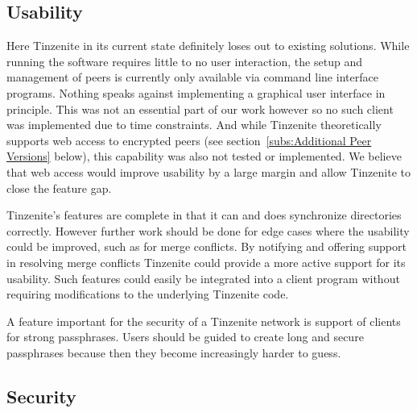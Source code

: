 %

\subsection{Usability}
\label{sub:Usability}

Here Tinzenite in its current state definitely loses out to existing solutions.
While running the software requires little to no user interaction, the setup and management of peers is currently only available via command line interface programs.
Nothing speaks against implementing a graphical user interface in principle.
This was not an essential part of our work however so no such client was implemented due to time constraints.
And while Tinzenite theoretically supports web access to encrypted peers (see section~\ref{subs:Additional Peer Versions} below), this capability was also not tested or implemented.
We believe that web access would improve usability by a large margin and allow Tinzenite to close the feature gap.

Tinzenite's features are complete in that it can and does synchronize directories correctly.
However further work should be done for edge cases where the usability could be improved, such as for merge conflicts.
By notifying and offering support in resolving merge conflicts Tinzenite could provide a more active support for its usability.
Such features could easily be integrated into a client program without requiring modifications to the underlying Tinzenite code.

A feature important for the security of a Tinzenite network is support of clients for strong passphrases.
Users should be guided to create long and secure passphrases because then they become increasingly harder to guess.

\subsection{Security}
\label{sub:Security}


